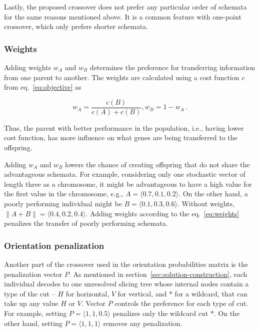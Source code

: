 Lastly, the proposed crossover does not prefer any particular order of schemata for the same reasons mentioned above.
It is a common feature with one-point crossover, which only prefers shorter schemata.

\subsubsection*{Weights}
Adding weights $w_A$ and $w_B$ determines the preference for transferring information from one parent to another.
The weights are calculated using a cost function $c$ from eq.~\ref{eq:objective} as

\begin{equation}
    w_A = \dfrac{c(B)}{c(A)+{c(B)}}, w_B = 1 - w_A\,.
    \label{eq:weights}
\end{equation}

Thus, the parent with better performance in the population, i.e., having lower cost function,
has more influence on what genes are being transferred to the offspring.

Adding $w_A$ and $w_B$ lowers the chance of creating offspring that do not share the advantageous schemata.
For example, considering only one stochastic vector of length three as a chromosome,
it might be advantageous to have a high value for the first value in the chromosome, e.g., $A=\langle 0.7, 0.1, 0.2 \rangle$.
On the other hand, a poorly performing individual might be $B=\langle 0.1, 0.3, 0.6 \rangle$.
Without weights, $\| A+B\| = \langle 0.4, 0.2 , 0.4 \rangle$.
Adding weights according to the eq.~\ref{eq:weights} penalizes the transfer of poorly performing schemata.

\subsubsection*{Orientation penalization}

Another part of the crossover used in the orientation probabilities matrix is the penalization vector $P$.
As mentioned in section~\ref{sec:solution-construction}, each individual decodes to one unresolved slicing tree
whose internal nodes contain a type of the cut – $H$ for horizontal, $V$ for vertical, and $*$ for a wildcard, that can take up any value $H$ or $V$.
Vector $P$ controls the preference for each type of cut.
For example, setting $P= \langle 1,1,0.5 \rangle$ penalizes only the wildcard cut $*$.
On the other hand, setting $P= \langle 1,1,1 \rangle$ removes any penalization.

